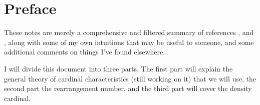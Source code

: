 \chapter*{Preface}

These notes are merely a comprehensive and filtered summary of references \cite{blass}, \cite{brech} and \cite{handbook}, along with some of my own intuitions that may be useful to someone, and some additional comments on things I've found elsewhere.

I will divide this document into three parts. The first part will explain the general theory of cardinal characteristics (still working on it) that we will use, the second part the rearrangement number, and the third part will cover the density cardinal.